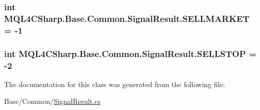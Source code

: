 \subsubsection[{\texorpdfstring{S\+E\+L\+L\+M\+A\+R\+K\+ET}{SELLMARKET}}]{\setlength{\rightskip}{0pt plus 5cm}int M\+Q\+L4\+C\+Sharp.\+Base.\+Common.\+Signal\+Result.\+S\+E\+L\+L\+M\+A\+R\+K\+ET = -\/1\hspace{0.3cm}{\ttfamily [static]}}\hypertarget{class_m_q_l4_c_sharp_1_1_base_1_1_common_1_1_signal_result_a4db9d51186d5d076989d819b4066ae49}{}\label{class_m_q_l4_c_sharp_1_1_base_1_1_common_1_1_signal_result_a4db9d51186d5d076989d819b4066ae49}
\subsubsection[{\texorpdfstring{S\+E\+L\+L\+S\+T\+OP}{SELLSTOP}}]{\setlength{\rightskip}{0pt plus 5cm}int M\+Q\+L4\+C\+Sharp.\+Base.\+Common.\+Signal\+Result.\+S\+E\+L\+L\+S\+T\+OP = -\/2\hspace{0.3cm}{\ttfamily [static]}}\hypertarget{class_m_q_l4_c_sharp_1_1_base_1_1_common_1_1_signal_result_a5c3231b6d6c10f0a67045d57e9dd47a8}{}\label{class_m_q_l4_c_sharp_1_1_base_1_1_common_1_1_signal_result_a5c3231b6d6c10f0a67045d57e9dd47a8}


The documentation for this class was generated from the following file\+:\begin{DoxyCompactItemize}
\item 
Base/\+Common/\hyperlink{_signal_result_8cs}{Signal\+Result.\+cs}\end{DoxyCompactItemize}
